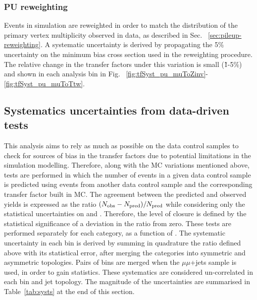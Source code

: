 \subsubsection*{PU reweighting}
\label{sec:tfSyst_pu}

Events in simulation are reweighted in order to match the distribution 
of the primary vertex multiplicity observed in data, as described in Sec. ~\ref{sec:pileup-reweighting}.
A systematic uncertainty is derived by propagating 
the 5\% uncertainty on the minimum bias cross section used in the reweighting procedure. 
The relative change in the transfer factors under this variation is
small (\~1-5\%)
and shown in each analysis bin in Fig. ~\ref{fig:tfSyst_pu_muToZinv}-\ref{fig:tfSyst_pu_muToTtw}.

\clearpage

\subsection{Systematics uncertainties from data-driven tests}
\label{sec:closure-tests}
This analysis aims to rely as much as possible on the data control samples
to check for sources of bias in the transfer factors due to potential limitations in
the simulation modelling. 
Therefore, along with the MC variations mentioned above, tests are performed 
in which the number of events in a given data control sample is predicted 
using events from another data control sample and the corresponding transfer factor built in MC. 
The agreement between the predicted and observed yields is
expressed as the ratio $(N_{\textrm{obs}} - N_{\textrm{pred}})/N_{\textrm{pred}}$ while considering only
the statistical uncertainties on \npre and \nobs. Therefore, the level
of closure is defined by the statistical significance of a deviation
in the ratio from zero.
These tests are performed separately for each \njet category, as a function of \scalht. 
The systematic uncertainty in each \scalht bin is derived by summing in quadrature the ratio 
defined above with its statistical error, after merging the \njet categories into symmetric and asymmetric topologies. 
Pairs of \scalht bins are merged when the $\mu\mu$+jets sample is used, in order to gain statistics. 
These systematics are considered un-correlated in each \scalht bin and jet topology. 
The magnitude of the uncertainties are summarised in Table~\ref{tab:systs} at
the end of this section. 

